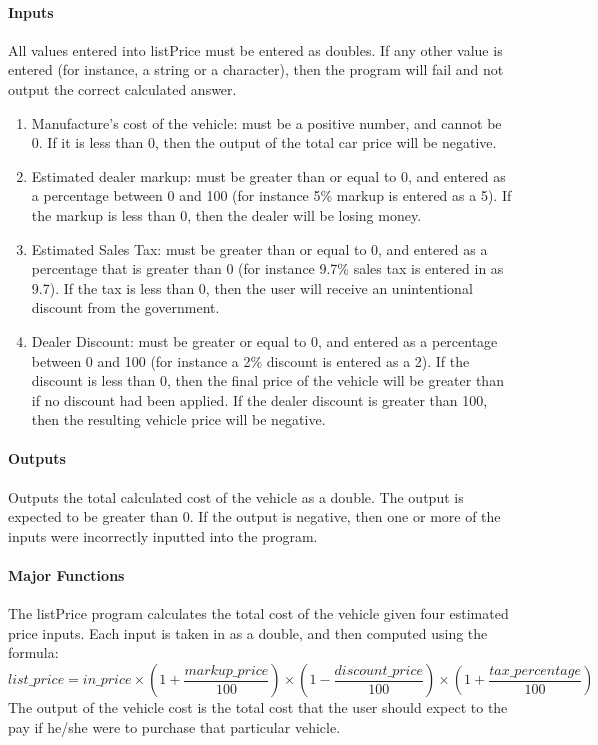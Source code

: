 \documentclass{article}
\begin{document}
		\paragraph{Inputs} All values entered into listPrice must be entered as doubles. If any other value is entered (for instance, a string or a character), then the program will fail and not output the correct calculated answer. 
		\begin{enumerate}
			\item Manufacture’s cost of the vehicle: must be a positive number, and cannot be 0. If it is less than 0, then the output of the total car price will be negative.
			\item Estimated dealer markup: must be greater than or equal to 0, and entered as a percentage between 0 and 100 (for instance 5\% markup is entered as a 5). If the markup is less than 0, then the dealer will be losing money. 
			\item Estimated Sales Tax: must be greater than or equal to 0, and entered as a percentage that is greater than 0 (for instance 9.7\% sales tax is entered in as 9.7). If the tax is less than 0, then the user will receive an unintentional discount from the government.
			\item Dealer Discount: must be greater or equal to 0, and entered as a percentage between 0 and 100 (for instance a 2\% discount is entered as a 2). If the discount is less than 0, then the final price of the vehicle will be greater than if no discount had been applied. If the dealer discount is greater than 100, then the resulting vehicle price will be negative.
		\end{enumerate}

		\paragraph{Outputs} Outputs the total calculated cost of the vehicle as a double. The output is expected to be greater than 0. If the output is negative, then one or more of the inputs were incorrectly inputted into the program. 

		\paragraph{Major Functions} The listPrice program calculates the total cost of the vehicle given four estimated price inputs. Each input is taken in as a double, and then computed using the formula: 
		\[list\_price = in\_price \times (1 + \frac{markup\_price}{100}) \times (1 - \frac{discount\_price}{100}) \times (1 + \frac{tax\_percentage}{100})\]
		The output of the vehicle cost is the total cost that the user should expect to the pay if he/she were to purchase that particular vehicle.
\end{document}
